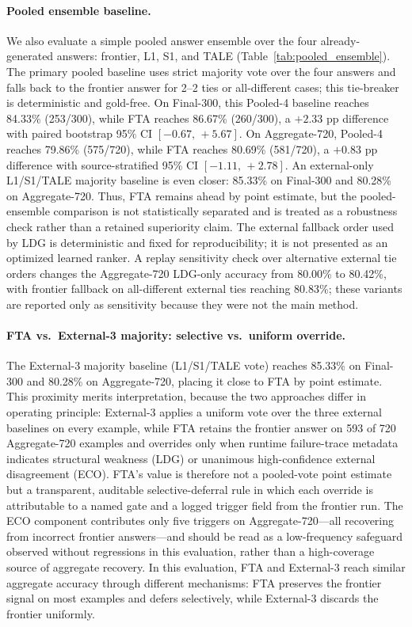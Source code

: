 \paragraph{Pooled ensemble baseline.}
We also evaluate a simple pooled answer ensemble over the four
already-generated answers: frontier, L1, S1, and TALE
(Table~\ref{tab:pooled_ensemble}).
The primary pooled baseline uses strict majority vote over the four answers
and falls back to the frontier answer for 2--2 ties or all-different cases;
this tie-breaker is deterministic and gold-free.
On Final-300, this Pooled-4 baseline reaches 84.33\% (253/300), while FTA
reaches 86.67\% (260/300), a $+2.33$ pp difference with paired bootstrap
95\% CI $[-0.67,\,+5.67]$.
On Aggregate-720, Pooled-4 reaches 79.86\% (575/720), while FTA reaches
80.69\% (581/720), a $+0.83$ pp difference with source-stratified 95\% CI
$[-1.11,\,+2.78]$.
An external-only L1/S1/TALE majority baseline is even closer: 85.33\% on
Final-300 and 80.28\% on Aggregate-720.
Thus, FTA remains ahead by point estimate, but the pooled-ensemble comparison
is not statistically separated and is treated as a robustness check rather
than a retained superiority claim.
The external fallback order used by LDG is deterministic and fixed for
reproducibility; it is not presented as an optimized learned ranker.
A replay sensitivity check over alternative external tie orders changes the
Aggregate-720 LDG-only accuracy from 80.00\% to 80.42\%, with frontier
fallback on all-different external ties reaching 80.83\%; these variants are
reported only as sensitivity because they were not the main method.

\paragraph{FTA vs.\ External-3 majority: selective vs.\ uniform override.}
The External-3 majority baseline (L1/S1/TALE vote) reaches 85.33\% on Final-300 and
80.28\% on Aggregate-720, placing it close to FTA by point estimate.
This proximity merits interpretation, because the two approaches differ in operating
principle: External-3 applies a uniform vote over the three external baselines on every
example, while FTA retains the frontier answer on 593 of 720 Aggregate-720 examples and
overrides only when runtime failure-trace metadata indicates structural weakness (LDG) or
unanimous high-confidence external disagreement (ECO).
FTA's value is therefore not a pooled-vote point estimate but a transparent, auditable
selective-deferral rule in which each override is attributable to a named gate and a logged
trigger field from the frontier run.
The ECO component contributes only five triggers on Aggregate-720---all recovering from
incorrect frontier answers---and should be read as a low-frequency safeguard observed without regressions
in this evaluation, rather than a high-coverage source of aggregate recovery.
In this evaluation, FTA and External-3 reach similar aggregate accuracy through different
mechanisms: FTA preserves the frontier signal on most examples and defers selectively,
while External-3 discards the frontier uniformly.


